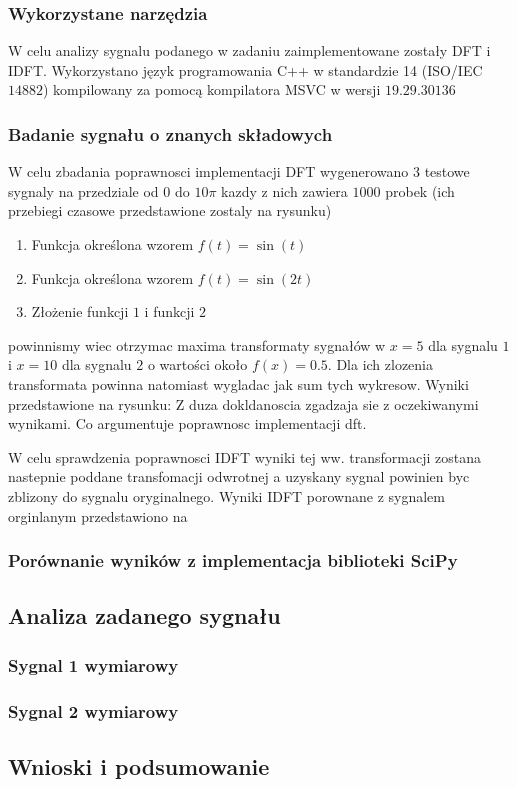 \documentclass{artikel3}
\begin{document}
\subsubsection{Wykorzystane narzędzia}

W celu analizy sygnalu podanego w zadaniu zaimplementowane zostały DFT i IDFT. Wykorzystano język programowania C++ w standardzie 14 (ISO/IEC $14882$) kompilowany za pomocą kompilatora MSVC w wersji $19.29.30136$

\subsubsection{Badanie sygnału o znanych składowych}

W celu zbadania poprawnosci implementacji DFT wygenerowano 3 testowe sygnaly na przedziale od $0$ do $10 \pi$ kazdy z nich zawiera $1000$ probek (ich przebiegi czasowe przedstawione zostaly na rysunku) %

\begin{enumerate}
    \item Funkcja określona wzorem $f(t) = \sin(t)$
    \item Funkcja określona wzorem $f(t) = \sin(2t)$
    \item Złożenie funkcji $1$ i funkcji $2$
\end{enumerate}

powinnismy wiec otrzymac maxima transformaty sygnałów w $x=5$ dla sygnalu $1$ i $x=10$ dla sygnalu $2$ o wartości około $f(x)=0.5$. Dla ich zlozenia transformata powinna natomiast wygladac jak sum tych wykresow. Wyniki przedstawione na rysunku: %
Z duza dokldanoscia %
zgadzaja sie z oczekiwanymi wynikami. Co argumentuje poprawnosc implementacji dft.

W celu sprawdzenia poprawnosci IDFT wyniki tej ww. transformacji zostana nastepnie poddane transfomacji odwrotnej a uzyskany sygnal powinien byc zblizony do sygnalu oryginalnego. Wyniki IDFT porownane z sygnalem orginlanym przedstawiono na %



\subsubsection{Porównanie wyników z implementacja biblioteki SciPy}


\subsection{Analiza zadanego sygnału}

\subsubsection{Sygnal 1 wymiarowy}

\subsubsection{Sygnal 2 wymiarowy}

\subsection{Wnioski i podsumowanie}
\end{document}
